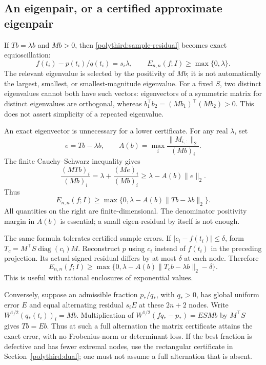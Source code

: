 \documentclass[11pt]{article}
\newcommand{\diag}{\operatorname{diag}}
\theoremstyle{remark}
\numberwithin{equation}{section}
\begin{document}
\subsection{An eigenpair, or a certified approximate eigenpair}
If $Tb=\lambda b$ and $Mb>0$, then
\eqref{polythird:sample-residual} becomes exact equioscillation:
\[
 f(t_i)-p(t_i)/q(t_i)=s_i\lambda,
 \qquad E_{n,n}(f;I)\ge\max\{0,\lambda\}.
\]
The relevant eigenvalue is selected by the positivity of $Mb$;
it is not automatically the largest, smallest, or smallest-magnitude
eigenvalue.  For a fixed $S$, two distinct eigenvalues cannot both
have such vectors: eigenvectors of a symmetric matrix for distinct
eigenvalues are orthogonal, whereas
$b_1^\top b_2=(Mb_1)^\top(Mb_2)>0$.
This does not assert simplicity of a repeated eigenvalue.

An exact eigenvector is unnecessary for a lower certificate.
For any real $\lambda$, set
\[
 e=Tb-\lambda b,\qquad
 A(b)=\max_i\frac{\|M_{i,:}\|_2}{(Mb)_i}.
\]
The finite Cauchy--Schwarz inequality gives
\[
 \frac{(MTb)_i}{(Mb)_i}
 =\lambda+\frac{(Me)_i}{(Mb)_i}
 \ge\lambda-A(b)\|e\|_2.
\]
Thus
\begin{equation}\label{polythird:spectral-residual-certificate}
 E_{n,n}(f;I)
 \ge\max\{0,\lambda-A(b)\|Tb-\lambda b\|_2\}.
\end{equation}
All quantities on the right are finite-dimensional.
The denominator positivity margin in $A(b)$ is essential; a small
eigen-residual by itself is not enough.

The same formula tolerates certified sample errors.  If
$|c_i-f(t_i)|\le\delta$, form $T_c=M^\top S\diag(c_i)M$.
Reconstruct $p$ using $c_i$ instead of $f(t_i)$ in the preceding
projection.  Its actual signed residual differs by at most $\delta$
at each node.  Therefore
\begin{equation}\label{polythird:spectral-sample-certificate}
 E_{n,n}(f;I)\ge
 \max\{0,\lambda-A(b)\|T_cb-\lambda b\|_2-\delta\}.
\end{equation}
This is useful with rational enclosures of exponential values.

Conversely, suppose an admissible fraction $p_*/q_*$, with $q_*>0$,
has global uniform error $E$ and equal alternating residual $s_iE$
at these $2n+2$ nodes.
Write $W^{1/2}(q_*(t_i))_i=Mb$.  Multiplication of
$W^{1/2}(f q_*-p_*)=ESMb$ by $M^\top S$ gives $Tb=Eb$.
Thus at such a full alternation the matrix certificate attains the
exact error, with no Frobenius-norm or determinant loss.  If the
best fraction is defective and has fewer extremal nodes, use the
rectangular certificate in Section~\ref{polythird:dual}; one must
not assume a full alternation that is absent.
\end{document}
